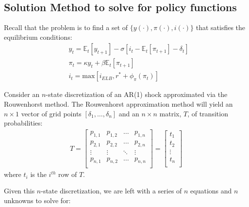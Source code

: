 \documentclass[11pt]{article}
\begin{document}
\begin{singlespace}
		
		\subsection{Solution Method to solve for policy functions}
	
		Recall that the problem is to find a set of $\{y(\cdot), \pi(\cdot), i(\cdot)\}$ that satisfies the equilibrium conditions: 
		\begin{align}
		& y_{t} = \mathbb{E}_t[y_{t+1}] - \sigma\left[i_t - \mathbb{E}_t[\pi_{t+1}]-\delta_t\right] \label{eq:EE_appx}\\
		& \pi_{t} = \kappa y_t + \beta\mathbb{E}_t[\pi_{t+1}]\label{eq:PC_appx}\\
		& i_t = \text{max}\left[i_{ELB},r^*  + \phi_{\pi}(\pi_t )\right]\label{eq:TR_appx}
		\end{align}
		
		Consider an $n$-state discretization of an AR(1) shock approximated via the Rouwenhorst method. The Rouwenhorst approximation method will yield an $n \times 1$ vector of grid points $[\delta_1,\dots,\delta_n]$ and an $n \times n$ matrix, $T$, of transition probabilities: 
		\begin{align}
		T=
		\begin{bmatrix}
		p_{1,1} & p_{1,2} & \dots & p_{1,n} \\
		p_{2,1} & p_{2,2} & \dots & p_{2,n} \\
		\vdots & \vdots & \ddots & \vdots \\
		p_{n,1} & p_{n,2} & \dots & p_{n,n} \\
		\end{bmatrix}
		= 
		\begin{bmatrix}
		t_1 \\
		t_2 \\
		\vdots \\
		t_n  \\
		\end{bmatrix}
		\end{align}
		where $t_i$ is the $i^{th}$ row of $T$.
		
		Given this  $n$-state discretization, we are left with a series of $n$ equations and $n$ unknowns to solve for: 
		

\end{singlespace}
\end{document}
